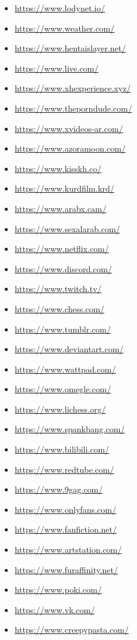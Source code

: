 \begin{multicols}{2}
\begin{itemize}
    \item \url{https://www.lodynet.io/}
    \item \url{https://www.weather.com/}
    \item \url{https://www.hentaislayer.net/}
    \item \url{https://www.live.com/}
    \item \url{https://www.xhexperience.xyz/}
    \item \url{https://www.theporndude.com/}
    \item \url{https://www.xvideos-ar.com/}
    \item \url{https://www.azoramoon.com/}
    \item \url{https://www.kisskh.co/}
    \item \url{https://www.kurdfilm.krd/}
    \item \url{https://www.arabx.cam/}
    \item \url{https://www.sexalarab.com/}
    \item \url{https://www.netflix.com/}
    \item \url{https://www.discord.com/}
    \item \url{https://www.twitch.tv/}
    \item \url{https://www.chess.com/}
    \item \url{https://www.tumblr.com/}
    \item \url{https://www.deviantart.com/}
    \item \url{https://www.wattpad.com/}
    \item \url{https://www.omegle.com/}
    \item \url{https://www.lichess.org/}
    \item \url{https://www.spankbang.com/}
    \item \url{https://www.bilibili.com/}
    \item \url{https://www.redtube.com/}
    \item \url{https://www.9gag.com/}
    \item \url{https://www.onlyfans.com/}
    \item \url{https://www.fanfiction.net/}
    \item \url{https://www.artstation.com/}
    \item \url{https://www.furaffinity.net/}
    \item \url{https://www.poki.com/}
    \item \url{https://www.vk.com/}
    \item \url{https://www.creepypasta.com/}

\end{itemize}
\end{multicols}
